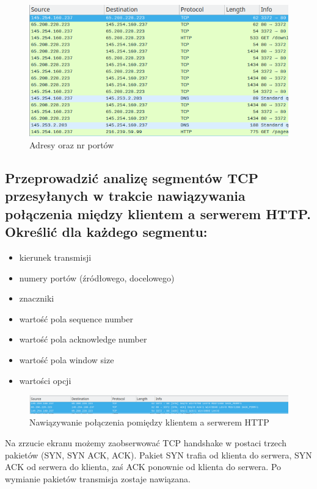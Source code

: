 \documentclass[polish, a4paper]{article}
\begin{document}
\begin{figure}[H]
\centering
\includegraphics[width=\textwidth]{internet.png}
\caption{Adresy oraz nr portów}
\end{figure}

\subsection{
Przeprowadzić analizę segmentów TCP przesyłanych w trakcie nawiązywania połączenia
między klientem a serwerem HTTP. Określić dla każdego segmentu:
}

\begin{itemize}
\item{kierunek transmisji}
\item{numery portów (źródłowego, docelowego)}
\item{znaczniki}
\item{wartość pola sequence number}
\item{wartość pola acknowledge number}
\item{wartość pola window size}
\item{wartości opcji}
\end{itemize}

\begin{figure}[H]
\centering
\includegraphics[width=\textwidth]{polaczenie.png}
\caption{Nawiązywanie połączenia pomiędzy klientem a serwerem HTTP}
\end{figure}

Na zrzucie ekranu możemy zaobserwować TCP handshake w postaci trzech pakietów (SYN, SYN ACK, ACK). Pakiet SYN trafia od klienta do serwera, SYN ACK od serwera do klienta, zaś ACK ponownie od klienta do serwera. Po wymianie pakietów transmisja zostaje nawiązana.
\end{document}
